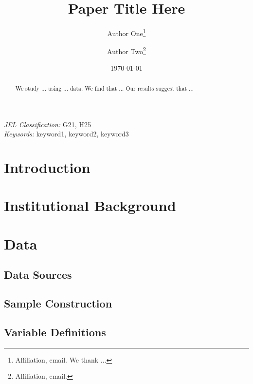\documentclass[12pt]{article}
\title{Paper Title Here}
\author{
  Author One\thanks{Affiliation, email. We thank ...}
  \and
  Author Two\thanks{Affiliation, email.}
}
\date{\today}
\begin{document}

\maketitle

\begin{abstract}
\noindent
We study ... using ... data. We find that ...
Our results suggest that ...
\end{abstract}

\vspace{1em}
\noindent\textit{JEL Classification:} G21, H25 \\
\noindent\textit{Keywords:} keyword1, keyword2, keyword3

\newpage

\section{Introduction}


\section{Institutional Background}


\section{Data}

\subsection{Data Sources}

\subsection{Sample Construction}

\subsection{Variable Definitions}
\end{document}
